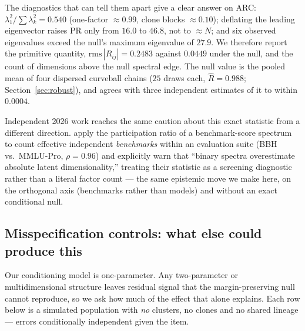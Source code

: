 \documentclass[pdflatex,sn-mathphys-ay]{sn-jnl}
\theoremstyle{thmstyleone}
\theoremstyle{thmstylethree}
\begin{document}
The diagnostics that can tell them apart give a clear answer on ARC:
$\lambda_1^2/\sum\lambda_k^2 = 0.540$ (one-factor $\approx0.99$, clone blocks $\approx0.10$);
deflating the leading eigenvector raises PR only from $16.0$ to $46.8$, not to $\approx N$; and
six observed eigenvalues exceed the null's maximum eigenvalue of $27.9$. We therefore report
the primitive quantity, $\mathrm{rms}\,|R_{ij}| = 0.2483$ against $0.0449$ under the null, and
the count of dimensions above the null spectral edge. The null value is the pooled mean of four
dispersed curveball chains ($25$ draws each, $\hat R = 0.988$; Section~\ref{sec:robust}), and
agrees with three independent estimates of it to within $0.0004$.

Independent 2026 work reaches the same caution about this exact statistic from a different
direction. \citet{benchscope2026} apply the participation ratio of a benchmark-score spectrum
to count effective independent \emph{benchmarks} within an evaluation suite (BBH vs.\ MMLU-Pro,
$\rho=0.96$) and explicitly warn that ``binary spectra overestimate absolute latent
dimensionality,'' treating their statistic as a screening diagnostic rather than a literal factor
count --- the same epistemic move we make here, on the orthogonal axis (benchmarks rather than
models) and without an exact conditional null.

\subsection{Misspecification controls: what else could produce this}

Our conditioning model is one-parameter. Any two-parameter or multidimensional structure leaves
residual signal that the margin-preserving null cannot reproduce, so we ask how much of the
effect that alone explains. Each row below is a simulated population with \emph{no} clusters, no
clones and no shared lineage --- errors conditionally independent given the item.
\end{document}
